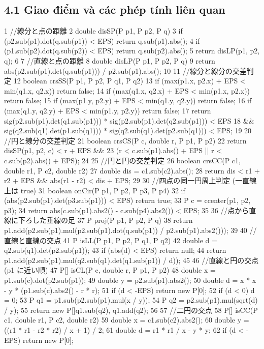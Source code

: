 \documentclass[11pt]{article}
\begin{document}
\subsection{4.1 Giao điểm và các phép tính liên quan}
\begin{Code}
1 //線分と点の距離
2 double disSP(P p1, P p2, P q) {
3 if (p2.sub(p1).dot(q.sub(p1)) < EPS) return q.sub(p1).abs();
4 if (p1.sub(p2).dot(q.sub(p2)) < EPS) return q.sub(p2).abs();
5 return disLP(p1, p2, q);
6 }
7 //直線と点の距離
8 double disLP(P p1, P p2, P q) {
9 return abs(p2.sub(p1).det(q.sub(p1))) / p2.sub(p1).abs();
10 }
11 //線分と線分の交差判定
12 boolean crsSS(P p1, P p2, P q1, P q2) {
13 if (max(p1.x, p2.x) + EPS < min(q1.x, q2.x)) return false;
14 if (max(q1.x, q2.x) + EPS < min(p1.x, p2.x)) return false;
15 if (max(p1.y, p2.y) + EPS < min(q1.y, q2.y)) return false;
16 if (max(q1.y, q2.y) + EPS < min(p1.y, p2.y)) return false;
17 return sig(p2.sub(p1).det(q1.sub(p1))) * sig(p2.sub(p1).det(q2.sub(p1))) < EPS
18 && sig(q2.sub(q1).det(p1.sub(q1))) * sig(q2.sub(q1).det(p2.sub(q1))) < EPS;
19 }
20 //円と線分の交差判定
21 boolean crsCS(P c, double r, P p1, P p2) {
22 return disSP(p1, p2, c) < r + EPS &&
23 (r < c.sub(p1).abs() + EPS || r < c.sub(p2).abs() + EPS);
24 }
25 //円と円の交差判定
26 boolean crsCC(P c1, double r1, P c2, double r2) {
27 double dis = c1.sub(c2).abs();
28 return dis < r1 + r2 + EPS && abs(r1 - r2) < dis + EPS;
29 }
30 //四点の同一円周上判定 (一直線上は true)
31 boolean onCir(P p1, P p2, P p3, P p4) {
32 if (abs(p2.sub(p1).det(p3.sub(p1))) < EPS) return true;
33 P c = ccenter(p1, p2, p3);
34 return abs(c.sub(p1).abs2() - c.sub(p4).abs2()) < EPS;
35 }
36 //点から直線に下ろした垂線の足
37 P proj(P p1, P p2, P q) {
38 return p1.add(p2.sub(p1).mul(p2.sub(p1).dot(q.sub(p1)) / p2.sub(p1).abs2()));
39 }
40 //直線と直線の交点
41 P isLL(P p1, P p2, P q1, P q2) {
42 double d = q2.sub(q1).det(p2.sub(p1));
43 if (abs(d) < EPS) return null;
44 return p1.add(p2.sub(p1).mul(q2.sub(q1).det(q1.sub(p1)) / d));
45 }
46 //直線と円の交点 (p1 に近い順)
47 P[] isCL(P c, double r, P p1, P p2) {
48 double x = p1.sub(c).dot(p2.sub(p1));
49 double y = p2.sub(p1).abs2();
50 double d = x * x - y * (p1.sub(c).abs2() - r * r);
51 if (d < -EPS) return new P[0];
52 if (d < 0) d = 0;
53 P q1 = p1.sub(p2.sub(p1).mul(x / y));
54 P q2 = p2.sub(p1).mul(sqrt(d) / y);
55 return new P[]{q1.sub(q2), q1.add(q2)};
56 }
57 //二円の交点
58 P[] isCC(P c1, double r1, P c2, double r2) {
59 double x = c1.sub(c2).abs2();
60 double y = ((r1 * r1 - r2 * r2) / x + 1) / 2;
61 double d = r1 * r1 / x - y * y;
62 if (d < -EPS) return new P[0];
}
\end{Code}
\end{document}
